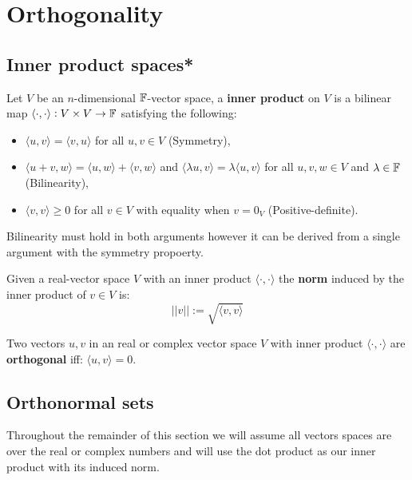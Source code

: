 \documentclass[../Year1/Year1.tex]{subfiles}
\begin{document}
\section{Orthogonality}

\subsection{Inner product spaces*}

\begin{definition}
    Let $V$ be an $n$-dimensional $\mathbb{F}$-vector space, a \textbf{inner product} on $V$ is a bilinear map $\langle\cdot,\cdot\rangle: V \times V \rightarrow \mathbb{F}$ satisfying the following: \begin{itemize}
        \item $\langle u,v \rangle=\langle v,u \rangle$ for all $u,v\in V$ (Symmetry),
        \item $\langle u+v,w \rangle=\langle u,w \rangle+\langle v,w \rangle$ and $\langle \lambda u,v \rangle=\lambda\langle u,v \rangle$ for all $u,v,w\in V$ and $\lambda\in\mathbb{F}$ (Bilinearity),
        \item $\langle v,v \rangle\geq 0$ for all $v\in V$ with equality when $v=0_V$ (Positive-definite).
    \end{itemize}
    Bilinearity must hold in both arguments however it can be derived from a single argument with the symmetry propoerty.
\end{definition}

\begin{definition}[Norm]
    Given a real-vector space $V$ with an inner product $\langle\cdot,\cdot\rangle$ the \textbf{norm} induced by the inner product of $v\in V$ is: \[
        ||v|| := \sqrt{\langle v,v\rangle}
    \]
\end{definition}

\begin{definition}[Orthogonality]
    Two vectors $u,v$ in an real or complex vector space $V$  with inner product $\langle\cdot,\cdot\rangle$ are \textbf{orthogonal} iff: $\langle u, v\rangle=0$.
\end{definition}

\subsection{Orthonormal sets}
Throughout the remainder of this section we will assume all vectors spaces are over the real or complex numbers and will use the dot product as our inner product with its induced norm.
\end{document}
